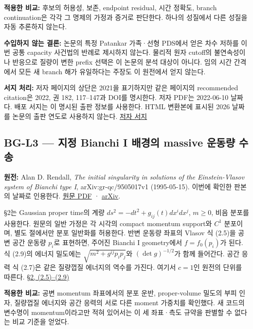 \textbf{적용한 비교:} 후보의 허용성, 보존, endpoint residual, 시간 정확도, branch continuation은 각각 그 명제의 가정과 증거로 판단한다. 하나의 성질에서 다른 성질을 자동 추론하지 않는다.

\textbf{수입하지 않는 결론:} 논문의 특정 Patankar 가족·선형 PDS에서 얻은 차수 저하를 이번 공통 capacity 사건법의 반례로 제시하지 않는다. 물리적 원자 cutoff의 불연속성이나 반응으로 질량이 변한 prefix 선택은 이 논문의 분석 대상이 아니다. 임의 시간 간격에서 모든 새 branch 해가 유일하다는 주장도 이 원전에서 얻지 않는다.

\textbf{서지 처리:} 저자 페이지의 상단은 2021을 표기하지만 같은 페이지의 recommended citation은 2022, 권 182, 117--147과 DOI를 명시한다. 저자 PDF는 2022-06-10 날짜다. 배포 서지는 이 명시된 출판 정보를 사용한다. HTML 변환본에 표시된 2026 날짜를 논문의 출판 연도로 사용하지 않는다. \href{https://davidetorlo.it/publication/2021-08-18-stability-patankar}{저자 서지}

\hypertarget{bg-l3-uxc9c0uxc815-bianchi-i-uxbc30uxacbduxc758-massive-uxc6b4uxb3d9uxb7c9-uxc218uxc1a1}{%
\subsection{BG-L3 --- 지정 Bianchi I 배경의 massive 운동량 수송}\label{bg-l3-uxc9c0uxc815-bianchi-i-uxbc30uxacbduxc758-massive-uxc6b4uxb3d9uxb7c9-uxc218uxc1a1}}

\textbf{원전:} Alan D. Rendall, \emph{The initial singularity in solutions of the Einstein-Vlasov system of Bianchi type I}, arXiv:gr-qc/9505017v1 (1995-05-15). 이번에 확인한 판본의 날짜로 인용한다. \href{https://export.arxiv.org/pdf/gr-qc/9505017v1.pdf}{원문 PDF} · \href{https://arxiv.org/abs/gr-qc/9505017}{arXiv}.

§2는 Gaussian proper time의 계량 \(ds^2=-dt^2+g_{ij}(t)dx^idx^j\), \(m\ge0\), 비음 분포를 사용한다. 원문의 일반 가정은 각 시각의 compact momentum support와 \(C^1\) 분포이며, 별도 절에서만 분포 일반화를 허용한다. 반변 운동량 좌표의 Vlasov 식 (2.5)을 공변 공간 운동량 \(p_i\)로 표현하면, 주어진 Bianchi I geometry에서 \(f=f_0(p_i)\)가 된다. 식 (2.9)의 에너지 밀도에는 \(\sqrt{m^2+g^{ij}p_ip_j}\)와 \((\det g)^{-1/2}\)가 함께 들어간다. 공간 응력 식 (2.7)은 같은 질량껍질 에너지의 역수를 가진다. 여기서 \(c=1\)인 원전의 단위를 따른다. \href{https://export.arxiv.org/pdf/gr-qc/9505017v1.pdf}{§2, (2.5)--(2.9)}

\textbf{적용한 비교:} 공변 momentum 좌표에서의 분포 운반, proper-volume 밀도의 부피 인자, 질량껍질 에너지와 공간 응력의 서로 다른 moment 가중치를 확인했다. 새 코드의 변수명이 momentum이라고만 적혀 있어서는 이 세 좌표·측도 규약을 판별할 수 없다는 비교 기준을 얻었다.

